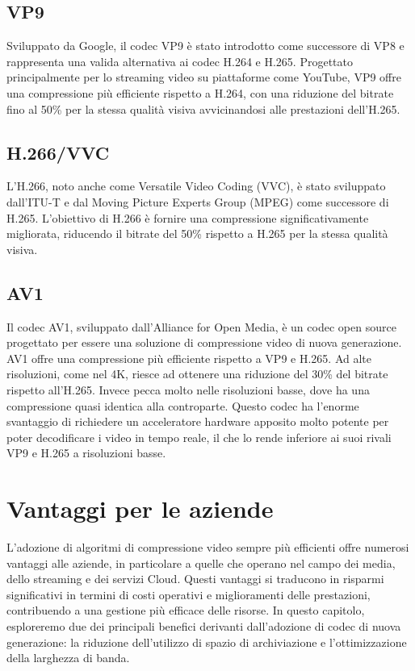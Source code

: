 \documentclass[a4paper,12pt, oneside]{article}
\begin{document}
\subsection{VP9}
Sviluppato da Google, il codec VP9 è stato introdotto come successore di VP8 e rappresenta una valida
alternativa ai codec H.264 e H.265. Progettato principalmente per lo streaming video su piattaforme come
YouTube, VP9 offre una compressione più efficiente rispetto a H.264, con una riduzione del bitrate fino al
50\% per la stessa qualità visiva avvicinandosi alle prestazioni dell'H.265.

\subsection{H.266/VVC}
L'H.266, noto anche come Versatile Video Coding (VVC), è stato sviluppato dall'ITU-T e dal Moving Picture
Experts Group (MPEG) come successore di H.265. L'obiettivo di H.266 è fornire una compressione
significativamente migliorata, riducendo il bitrate del 50\% rispetto a H.265 per la stessa qualità visiva.

\subsection{AV1}
Il codec AV1, sviluppato dall'Alliance for Open Media, è un codec open source progettato per essere una
soluzione di compressione video di nuova generazione. AV1 offre una compressione più efficiente rispetto
a VP9 e H.265. Ad alte risoluzioni, come nel 4K, riesce ad ottenere una riduzione del 30\% del bitrate
rispetto all'H.265. Invece pecca molto nelle risoluzioni basse, dove ha una compressione quasi identica
alla controparte. Questo codec ha l'enorme svantaggio di richiedere un acceleratore hardware apposito
molto potente per poter decodificare i video in tempo reale, il che lo rende inferiore ai suoi rivali VP9
e H.265 a risoluzioni basse.

\section{Vantaggi per le aziende}
L'adozione di algoritmi di compressione video sempre più efficienti offre numerosi vantaggi alle aziende,
in particolare a quelle che operano nel campo dei media, dello streaming e dei servizi Cloud. Questi
vantaggi si traducono in risparmi significativi in termini di costi operativi e miglioramenti delle
prestazioni, contribuendo a una gestione più efficace delle risorse. In questo capitolo, esploreremo due
dei principali benefici derivanti dall'adozione di codec di nuova generazione: la riduzione dell'utilizzo
di spazio di archiviazione e l'ottimizzazione della larghezza di banda.
\end{document}
